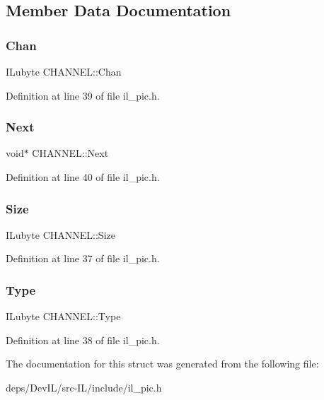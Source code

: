 \subsection{Member Data Documentation}
\mbox{\label{structCHANNEL_addd19c7a9ff16b0c86265b32f65a55ae}} 
\subsubsection{\texorpdfstring{Chan}{Chan}}
{\footnotesize\ttfamily I\+Lubyte C\+H\+A\+N\+N\+E\+L\+::\+Chan}



Definition at line 39 of file il\+\_\+pic.\+h.

\mbox{\label{structCHANNEL_ac8dfd5d6485e4fcc75a237ee091ea7d3}} 
\subsubsection{\texorpdfstring{Next}{Next}}
{\footnotesize\ttfamily void$\ast$ C\+H\+A\+N\+N\+E\+L\+::\+Next}



Definition at line 40 of file il\+\_\+pic.\+h.

\mbox{\label{structCHANNEL_a318ea4639fc71fa55144c48ebed36d9e}} 
\subsubsection{\texorpdfstring{Size}{Size}}
{\footnotesize\ttfamily I\+Lubyte C\+H\+A\+N\+N\+E\+L\+::\+Size}



Definition at line 37 of file il\+\_\+pic.\+h.

\mbox{\label{structCHANNEL_a69581dc1aa82aef140de6d16d2e88155}} 
\subsubsection{\texorpdfstring{Type}{Type}}
{\footnotesize\ttfamily I\+Lubyte C\+H\+A\+N\+N\+E\+L\+::\+Type}



Definition at line 38 of file il\+\_\+pic.\+h.



The documentation for this struct was generated from the following file\+:\begin{DoxyCompactItemize}
\item 
deps/\+Dev\+I\+L/src-\/\+I\+L/include/il\+\_\+pic.\+h\end{DoxyCompactItemize}
